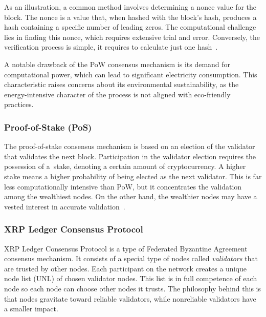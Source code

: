 As an illustration, a common method involves determining a nonce value for the block. The nonce is a value that, when hashed with the block's hash, produces a hash containing a specific number of leading zeros. The computational challenge lies in finding this nonce, which requires extensive trial and error. Conversely, the verification process is simple, it requires to calculate just one hash~\cite{bc.technology.overview}.

A notable drawback of the PoW consensus mechanism is its demand for computational power, which can lead to significant electricity consumption. This characteristic raises concerns about its environmental sustainability, as the energy-intensive character of the process is not aligned with eco-friendly practices.

\subsubsection{Proof-of-Stake (PoS)}

The proof-of-stake consensus mechanism is based on an election of the validator that validates the next block. Participation in the validator election requires the possession of a~stake, denoting a certain amount of cryptocurrency. A higher stake means a higher probability of being elected as the next validator. This is far less computationally intensive than PoW, but it concentrates the validation among the wealthiest nodes. On the other hand, the wealthier nodes may have a vested interest in accurate validation~\cite{vademecun.blockchain}.

\subsubsection{XRP Ledger Consensus Protocol}

XRP Ledger Consensus Protocol is a type of Federated Byzantine Agreement consensus mechanism. It consists of a special type of nodes called \emph{validators} that are trusted by other nodes. Each participant on the network creates a unique node list (UNL) of chosen validator nodes. This list is in full competence of each node so each node can choose other nodes it trusts. The philosophy behind this is that nodes gravitate toward reliable validators, while nonreliable validators have a smaller impact.


